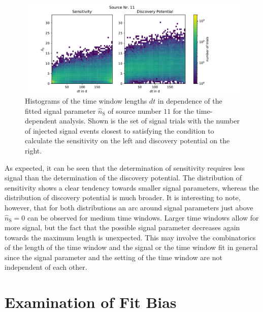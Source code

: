 \begin{figure}
    \centering
    \includegraphics[width=\linewidth]{Plots/05_csky/time_window_ns_disc_sens_time_dep_1.pdf}
    \caption{Histograms of the time window lengths $dt$ in dependence of the fitted signal parameter $\hat{n}_\text{S}$ of source number $\num{11}$ for the time-dependent analysis. Shown is the set of signal trials with the number of injected signal events closest to satisfying the condition to calculate the sensitivity on the left and discovery potential on the right.}
    \label{fig:sens_disc_ns_dt_1}
\end{figure}
As expected, it can be seen that the determination of sensitivity requires less signal than the determination of the discovery potential.
The distribution of sensitivity shows a clear tendency towards smaller signal parameters, whereas the distribution of discovery potential is much broader.
It is interesting to note, however, that for both distributions an arc around signal parameters just above $\hat{n}_\text{S}=0$ can be observed for medium time windows.
Larger time windows allow for more signal, but the fact that the possible signal parameter decreases again towards the maximum length is unexpected.
This may involve the combinatorics of the length of the time window and the signal or the time window fit in general since the signal parameter and the setting of the time window are not independent of each other.

\section{Examination of Fit Bias}

